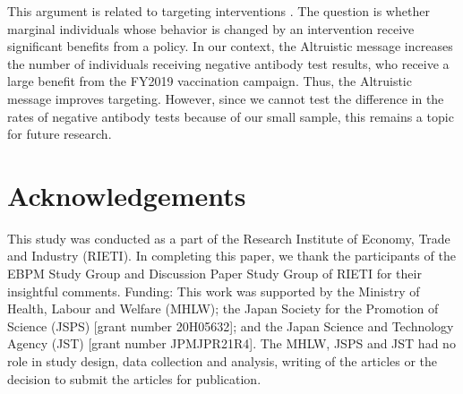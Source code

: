 \documentclass[
      12pt,
    a4paper
]{article}
\begin{document}
This argument is related to targeting interventions \citep[e.g.,][]{Finkelstein2019}. The question is whether marginal individuals whose behavior is changed by an intervention receive significant benefits from a policy. In our context, the Altruistic message increases the number of individuals receiving negative antibody test results, who receive a large benefit from the FY2019 vaccination campaign. Thus, the Altruistic message improves targeting. However, since we cannot test the difference in the rates of negative antibody tests because of our small sample, this remains a topic for future research.

\hypertarget{acknowledgements}{%
\section*{Acknowledgements}\label{acknowledgements}}

This study was conducted as a part of the Research Institute of Economy, Trade and Industry (RIETI). In completing this paper, we thank the participants of the EBPM Study Group and Discussion Paper Study Group of RIETI for their insightful comments. Funding: This work was supported by the Ministry of Health, Labour and Welfare (MHLW); the Japan Society for the Promotion of Science (JSPS) {[}grant number 20H05632{]}; and the Japan Science and Technology Agency (JST) {[}grant number JPMJPR21R4{]}. The MHLW, JSPS and JST had no role in study design, data collection and analysis, writing of the articles or the decision to submit the articles for publication.

\clearpage


\end{document}
